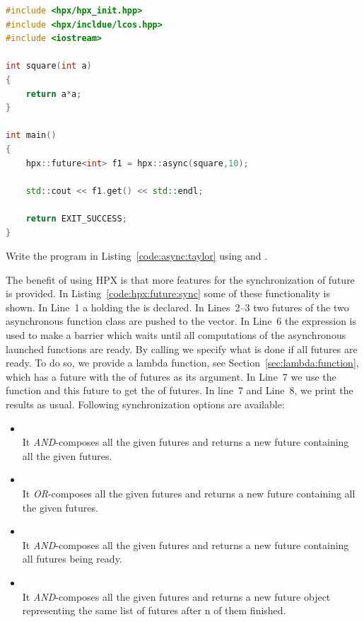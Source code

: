 \documentclass[11pt,fleqn]{book} %
\begin{document}
\begin{lstlisting}[language=c++,caption={Asynchronous computation of the square number using HPX.\label{code:hpx:future}},float,floatplacement=tb]
#include <hpx/hpx_init.hpp>
#include <hpx/incldue/lcos.hpp>
#include <iostream>

int square(int a)
{ 
    return a*a; 
}

int main()
{
    hpx::future<int> f1 = hpx::async(square,10); 
    
    std::cout << f1.get() << std::endl;
    
    return EXIT_SUCCESS;
}

\end{lstlisting}

\begin{exercise}
Write the program in Listing~\ref{code:async:taylor} using  and .
\end{exercise}

The benefit of using HPX is that more features for the synchronization of future is provided. In Listing~\ref{code:hpx:future:sync} some of these functionality is shown. In Line~1 a  holding the  is declared. In Lines~2--3 two futures of the two asynchronous function class are pushed to the vector. In Line~6 the expression  is used to make a barrier which waits until all computations of the asynchronous launched functions are ready. By calling  we specify what is done if all futures are ready. To do so, we provide a lambda function, see Section~\ref{sec:lambda:function}, which has a future with the  of futures as its argument. In Line~7 we use the function  and this future to get the  of futures. In line~7 and Line~8, we print the results as usual. Following synchronization options are available:
\begin{itemize}
\item {} \\
It \textit{AND}-composes all the given futures and returns a new future containing all the given futures.
\item {} \\
It \textit{OR}-composes all the given futures and returns a new future containing all the given futures.
\item {} \\
It \textit{AND}-composes all the given futures and returns a new future containing all futures being ready.
\item {} \\
It \textit{AND}-composes all the given futures and returns a new future object representing the same list of futures after n of them finished.
\end{itemize}
\end{document}

